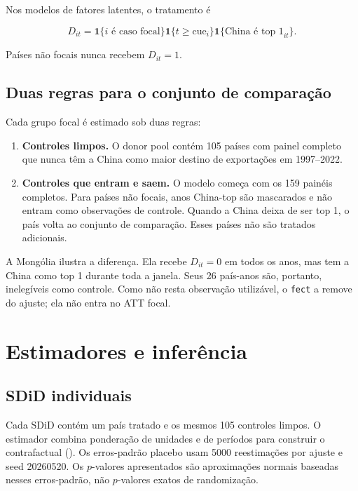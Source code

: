 \documentclass[
  brazilian,
  11pt,
]{article}
\providecommand{\tightlist}{%
  \setlength{\itemsep}{0pt}\setlength{\parskip}{0pt}}
\begin{document}
Nos modelos de fatores latentes, o tratamento é

\[
D_{it}
=
\mathbf{1}\{i\text{ é caso focal}\}
\mathbf{1}\{t\geq \text{cue}_i\}
\mathbf{1}\{\text{China é top 1}_{it}\}.
\]

Países não focais nunca recebem \(D_{it}=1\).

\subsection{Duas regras para o conjunto de
comparação}\label{duas-regras-para-o-conjunto-de-comparauxe7uxe3o}

Cada grupo focal é estimado sob duas regras:

\begin{enumerate}
\def\labelenumi{\arabic{enumi}.}
\tightlist
\item
  \textbf{Controles limpos.} O donor pool contém 105 países com painel
  completo que nunca têm a China como maior destino de exportações em
  1997--2022.
\item
  \textbf{Controles que entram e saem.} O modelo começa com os 159
  painéis completos. Para países não focais, anos China-top são
  mascarados e não entram como observações de controle. Quando a China
  deixa de ser top 1, o país volta ao conjunto de comparação. Esses
  países não são tratados adicionais.
\end{enumerate}

A Mongólia ilustra a diferença. Ela recebe \(D_{it}=0\) em todos os
anos, mas tem a China como top 1 durante toda a janela. Seus 26
país-anos são, portanto, inelegíveis como controle. Como não resta
observação utilizável, o \texttt{fect} a remove do ajuste; ela não entra
no ATT focal.

\section{Estimadores e inferência}\label{estimadores-e-inferuxeancia}

\subsection{SDiD individuais}\label{sdid-individuais}

Cada SDiD contém um país tratado e os mesmos 105 controles limpos. O
estimador combina ponderação de unidades e de períodos para construir o
contrafactual (). Os erros-padrão placebo usam 5000 reestimações por ajuste e seed
20260520. Os \(p\)-valores apresentados são aproximações normais
baseadas nesses erros-padrão, não \(p\)-valores exatos de randomização.
\end{document}
